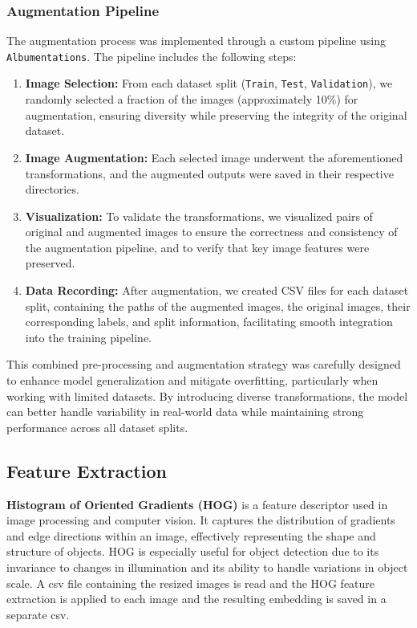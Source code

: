 \documentclass[10pt,twocolumn,letterpaper]{article}
\begin{document}
\subsubsection{Augmentation Pipeline}

The augmentation process was implemented through a custom pipeline using \texttt{Albumentations}. The pipeline includes the following steps:
\begin{enumerate}
    \item \textbf{Image Selection:} From each dataset split (\texttt{Train}, \texttt{Test}, \texttt{Validation}), we randomly selected a fraction of the images (approximately 10\%) for augmentation, ensuring diversity while preserving the integrity of the original dataset.
    
    \item \textbf{Image Augmentation:} Each selected image underwent the aforementioned transformations, and the augmented outputs were saved in their respective directories.
    
    \item \textbf{Visualization:} To validate the transformations, we visualized pairs of original and augmented images to ensure the correctness and consistency of the augmentation pipeline, and to verify that key image features were preserved.
    
    \item \textbf{Data Recording:} After augmentation, we created CSV files for each dataset split, containing the paths of the augmented images, the original images, their corresponding labels, and split information, facilitating smooth integration into the training pipeline.
\end{enumerate}

This combined pre-processing and augmentation strategy was carefully designed to enhance model generalization and mitigate overfitting, particularly when working with limited datasets. By introducing diverse transformations, the model can better handle variability in real-world data while maintaining strong performance across all dataset splits.



\subsection{Feature Extraction}
\textbf{Histogram of Oriented Gradients (HOG)} is a feature descriptor used in image processing and computer vision. It captures the distribution of gradients and edge directions within an image, effectively representing the shape and structure of objects. HOG is especially useful for object detection due to its invariance to changes in illumination and its ability to handle variations in object scale. 
A csv file containing the resized images is read and the HOG feature extraction is applied to each image and the resulting embedding is saved in a separate csv.
\end{document}
